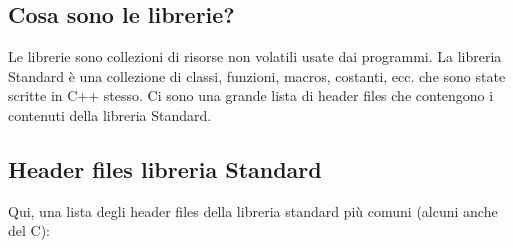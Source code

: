 \subsection{Cosa sono le librerie?}

\textsf{\small Le librerie sono collezioni di risorse non volatili usate dai programmi. La libreria Standard è una collezione di classi, funzioni, macros, costanti, ecc. che sono state scritte in C++ stesso. Ci sono una grande lista di header files che contengono i contenuti della libreria Standard.} \\

\subsection{Header files libreria Standard}

\textsf{\small Qui, una lista degli header files della libreria standard più comuni (alcuni anche del C): } \break

